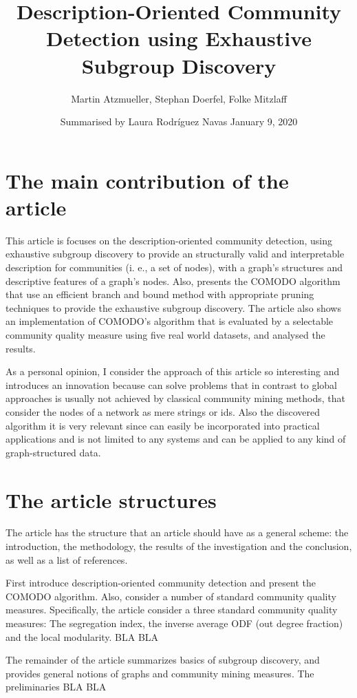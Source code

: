 \documentclass[a4paper]{article}
\title{Description-Oriented Community Detection using Exhaustive Subgroup Discovery}
\date{Summarised by Laura Rodríguez Navas \vskip 0.3cm January 9, 2020}
\author{Martin Atzmueller, Stephan Doerfel, Folke Mitzlaff}
\begin{document}
	
\maketitle

\section*{The main contribution of the article}
This article is focuses on the description-oriented community detection, using exhaustive subgroup discovery to provide an structurally valid and interpretable description for communities (i. e., a set of nodes), with a graph's structures and descriptive features of a graph’s nodes. Also, presents the COMODO algorithm that use an efficient branch and bound method with appropriate pruning techniques to provide the exhaustive subgroup discovery. The article also shows an implementation of COMODO's algorithm that is evaluated by a selectable community quality measure using five real world datasets, and analysed the results.
\vskip 0.3cm

As a personal opinion, I consider the approach of this article so interesting and introduces an innovation because can solve problems that in contrast to global approaches is usually not achieved by classical community mining methods, that consider the nodes of a network as mere strings or ids. Also the discovered algorithm it is very relevant since can easily be incorporated into practical applications and is not limited to any systems and can be applied to any kind of graph-structured data.

\section*{The article structures}
The article has the structure that an article should have as a general scheme: the introduction, the methodology, the results of the investigation and the conclusion, as well as a list of references.
\vskip 0.3cm

First introduce description-oriented community detection and present the COMODO algorithm. Also, consider a number of standard community quality measures. Specifically, the article consider a three standard community quality measures: The segregation index, the inverse average ODF (out degree fraction) and the local modularity.  BLA BLA
\vskip 0.3cm

The remainder of the article summarizes basics of subgroup discovery, and provides general notions of graphs and community mining measures. The preliminaries BLA BLA
\vskip 0.3cm
\end{document}
